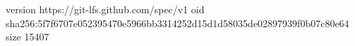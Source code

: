 version https://git-lfs.github.com/spec/v1
oid sha256:5f7f6707e052395470e5966bb3314252d15d1d58035de02897939f0b07c80e64
size 15407
